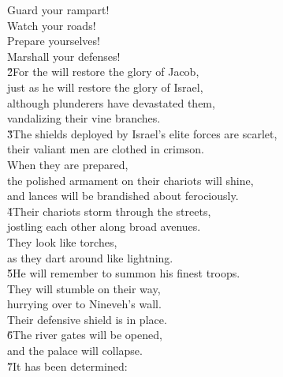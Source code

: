 \begin{poetry}
\poeml Guard your rampart! \\
\poemlll       Watch your roads! \\
\poeml Prepare yourselves! \\
\poemll    Marshall your defenses! \\
\poeml \v{2}For the  will restore the glory of Jacob, \\
\poemll    just as he will restore the glory of Israel, \\
\poeml although plunderers have devastated them, \\
\poemll    vandalizing their vine branches. \\
\poeml \v{3}The shields deployed by Israel's elite forces are scarlet, \\
\poemll    their valiant men are clothed in crimson. \\
\poeml When they are prepared, \\
\poemll    the polished armament on their chariots will shine, \\
\poemlll       and lances will be brandished about ferociously. \\
\poeml \v{4}Their chariots storm through the streets, \\
\poemll    jostling each other along broad avenues. \\
\poeml They look like torches, \\
\poemll    as they dart around like lightning. \\
\poeml \v{5}He will remember to summon his finest troops. \\
\poemll    They will stumble on their way, \\
\poemlll       hurrying over to Nineveh's wall. \\
\poeml Their defensive shield is in place. \\
\poeml \v{6}The river gates will be opened, \\
\poemll    and the palace will collapse. \\
\poeml \v{7}It has been determined: \\

\end{poetry}
